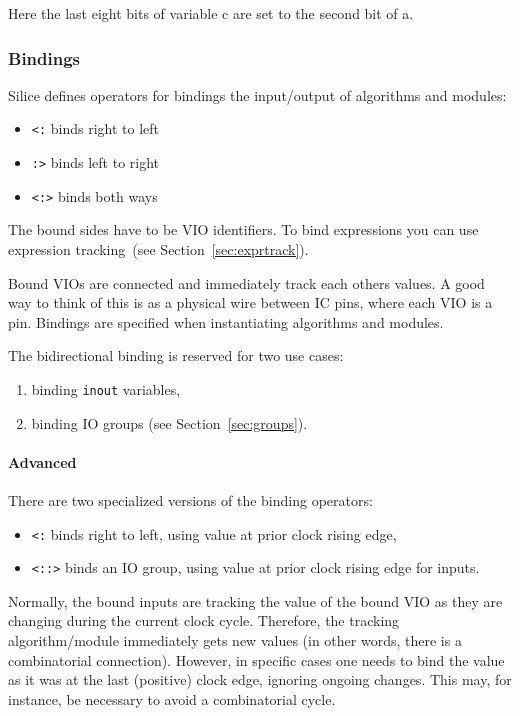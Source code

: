 \documentclass[a4]{article}
\newcommand\todo[1]{{\color{magenta}\textbf{TODO:} #1}}
\newcommand\silice{Silice}
\begin{document}
Here the last eight bits of variable c are set to the second bit of a.

\subsubsection{Bindings}
\label{sec:bindings}

\silice{} defines operators for bindings the input/output of algorithms and modules:
\begin{itemize}
	\item \texttt{<:} binds right to left
	\item \texttt{:>} binds left to right
	\item \texttt{<:>} binds both ways %
\end{itemize}

The bound sides have to be VIO identifiers. To bind expressions you can use expression tracking~(see Section~\ref{sec:exprtrack}).

Bound VIOs are connected and immediately track each others values.
A good way to think of this is as a physical wire between IC pins, where each VIO is a pin.
Bindings are specified when instantiating algorithms and modules. 

The bidirectional binding is reserved for two use cases:
\begin{enumerate}
\item binding \texttt{inout} variables,
\item binding IO groups (see Section~\ref{sec:groups}).
\end{enumerate}

\paragraph{Advanced}

There are two specialized versions of the binding operators:
\begin{itemize}
	\item \texttt{<:} binds right to left, using value at prior clock rising edge,
	\item \texttt{<::>} binds an IO group, using value at prior clock rising edge for inputs.
\end{itemize}

Normally, the bound inputs are tracking the value of the bound VIO as they are changing during the current clock cycle. Therefore, the tracking algorithm/module immediately gets new values (in other words, there is a combinatorial connection). However, in specific cases one needs to bind the value as it was at the last (positive) clock edge, ignoring ongoing changes. This may, for instance, be necessary to avoid a combinatorial cycle.
\end{document}
